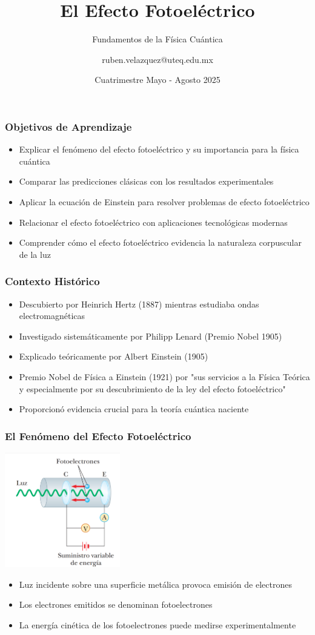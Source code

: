 \documentclass{beamer}
\title[Efecto Fotoeléctrico]{El Efecto Fotoeléctrico}
\subtitle{Fundamentos de la Física Cuántica}
\author{ruben.velazquez@uteq.edu.mx}
\institute[UTEQ]{Universidad Tecnológica de Querétaro}
\date{Cuatrimestre Mayo - Agosto 2025}
\begin{document}
	
	\frame{\titlepage}
	
	\begin{frame}
		\frametitle{Objetivos de Aprendizaje}
		\begin{itemize}
			\item Explicar el fenómeno del efecto fotoeléctrico y su importancia para la física cuántica
			\item Comparar las predicciones clásicas con los resultados experimentales
			\item Aplicar la ecuación de Einstein para resolver problemas de efecto fotoeléctrico
			\item Relacionar el efecto fotoeléctrico con aplicaciones tecnológicas modernas
			\item Comprender cómo el efecto fotoeléctrico evidencia la naturaleza corpuscular de la luz
		\end{itemize}
	\end{frame}
	
	\begin{frame}
		\frametitle{Contexto Histórico}
		\begin{itemize}
			\item Descubierto por Heinrich Hertz (1887) mientras estudiaba ondas electromagnéticas
			\item Investigado sistemáticamente por Philipp Lenard (Premio Nobel 1905)
			\item Explicado teóricamente por Albert Einstein (1905) 
			\item Premio Nobel de Física a Einstein (1921) por "sus servicios a la Física Teórica y especialmente por su descubrimiento de la ley del efecto fotoeléctrico"
			\item Proporcionó evidencia crucial para la teoría cuántica naciente
		\end{itemize}
	\end{frame}
	
	\begin{frame}
		\frametitle{El Fenómeno del Efecto Fotoeléctrico}
		\begin{center}
			\includegraphics[height=5cm]{../Imagenes/EFE_diagrama}
		\end{center}
		\begin{itemize}
			\item Luz incidente sobre una superficie metálica provoca emisión de electrones
			\item Los electrones emitidos se denominan \alert{fotoelectrones}
			\item La energía cinética de los fotoelectrones puede medirse experimentalmente
		\end{itemize}
	\end{frame}
	
\end{document}
